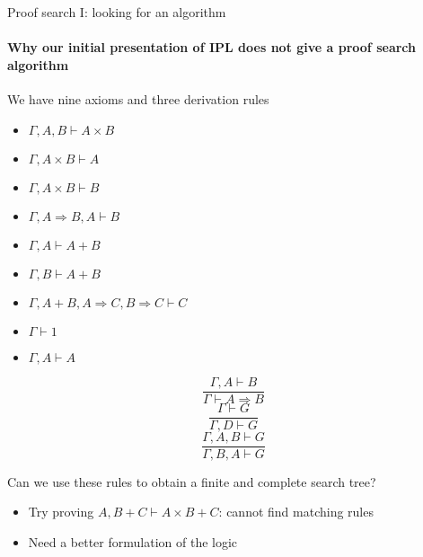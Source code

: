 \documentclass[english]{beamer}
\begin{document}
\begin{frame}{Proof search I: looking for an algorithm}


\framesubtitle{Why our initial presentation of IPL does not give a proof search
algorithm}

We have nine axioms and three derivation rules

\begin{minipage}[t]{0.49\columnwidth}%
\begin{itemize}
\item $\Gamma,A,B\vdash A\times B$ 
\item $\Gamma,A\times B\vdash A$ 
\item $\Gamma,A\times B\vdash B$
\item $\Gamma,A\Rightarrow B,A\vdash B$
\item $\Gamma,A\vdash A+B$ 
\item $\Gamma,B\vdash A+B$
\item $\Gamma,A+B,A\Rightarrow C,B\Rightarrow C\vdash C$
\item $\Gamma\vdash1$
\item $\Gamma,A\vdash A$
\end{itemize}
%
\end{minipage}%
\begin{minipage}[t]{0.49\columnwidth}%
\[
\frac{\Gamma,A\vdash B}{\Gamma\vdash A\Rightarrow B}
\]
\[
\frac{\Gamma\vdash G}{\Gamma,D\vdash G}
\]
\[
\frac{\Gamma,A,B\vdash G}{\Gamma,B,A\vdash G}
\]
%
\end{minipage}

\medskip{}
Can we use these rules to obtain a finite and complete search tree?
\begin{itemize}
\item Try proving $A,B+C\vdash A\times B+C$: cannot find matching rules
\item Need a better formulation of the logic
\end{itemize}
\end{frame}
\end{document}
